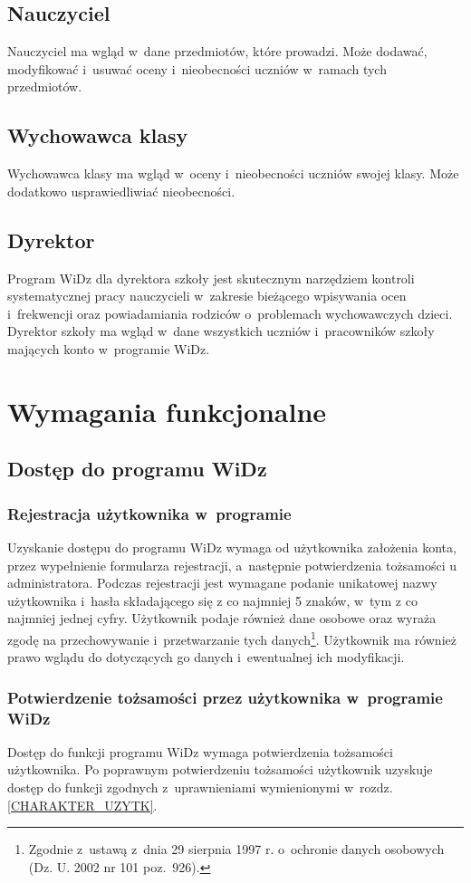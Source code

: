 \documentclass[12pt,leqno,twoside]{mwart}
\begin{document}
\subsection{Nauczyciel}
\noindent Nauczyciel ma wgląd w~dane przedmiotów, które prowadzi. Może dodawać, modyfikować i~usuwać oceny i~nieobecności uczniów w~ramach tych przedmiotów.

\subsection{Wychowawca klasy}
\noindent Wychowawca klasy ma wgląd w~oceny i~nieobecności uczniów swojej klasy. Może dodatkowo usprawiedliwiać nieobecności.

\subsection{Dyrektor}
\noindent Program WiDz dla dyrektora szkoły jest skutecznym narzędziem kontroli systematycznej pracy nauczycieli w~zakresie bieżącego wpisywania ocen i~frekwencji oraz powiadamiania rodziców o~problemach wychowawczych dzieci. Dyrektor szkoły ma wgląd w~dane wszystkich uczniów i~pracowników szkoły mających konto w~programie WiDz.

\section{Wymagania funkcjonalne}
\subsection{Dostęp do programu WiDz}
\subsubsection{Rejestracja użytkownika w~programie}
\noindent Uzyskanie dostępu do programu WiDz wymaga od użytkownika założenia konta, przez wypełnienie formularza rejestracji, a~następnie potwierdzenia tożsamości u administratora. Podczas rejestracji jest wymagane podanie unikatowej nazwy użytkownika i~hasła składającego się z co najmniej 5 znaków, w~tym z co najmniej jednej cyfry. Użytkownik podaje również dane osobowe oraz wyraża zgodę na przechowywanie i~przetwarzanie tych danych\footnote{Zgodnie z~ustawą z~dnia 29 sierpnia 1997 r. o~ochronie danych osobowych (Dz. U. 2002 nr 101 poz.~926).}. Użytkownik ma również prawo wglądu do dotyczących go danych i~ewentualnej ich modyfikacji.

\subsubsection{Potwierdzenie tożsamości przez użytkownika w~programie WiDz}
\noindent Dostęp do funkcji programu WiDz wymaga potwierdzenia tożsamości użytkownika. Po poprawnym potwierdzeniu tożsamości użytkownik uzyskuje dostęp do funkcji zgodnych z~uprawnieniami wymienionymi w~rozdz. \ref{CHARAKTER_UZYTK}. 
\end{document}
